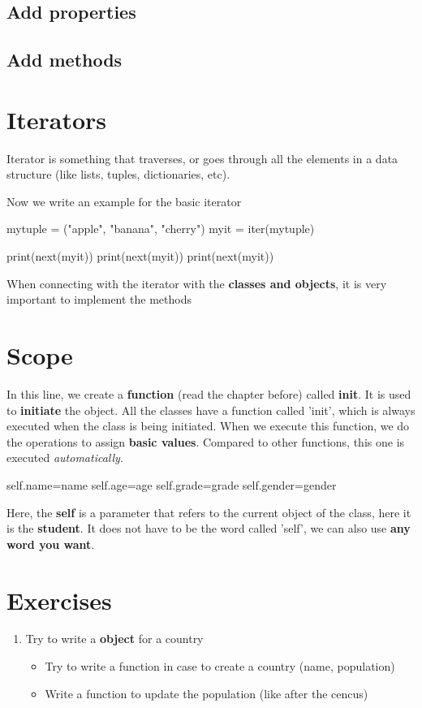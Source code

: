 \documentclass[12pt]{article}
\begin{document}
\subsection{Add properties}
\subsection{Add methods}
\section{Iterators}
Iterator is something that traverses, or goes through all the elements in a data structure (like lists, tuples, dictionaries, etc).

Now we write an example for the basic iterator
\begin{python}
mytuple = ("apple", "banana", "cherry")
myit = iter(mytuple)

print(next(myit))
print(next(myit))
print(next(myit))
\end{python}

When connecting with the iterator with the \textbf{classes and objects}, it is very important to implement the methods 
\section{Scope}

\par In this line, we create a \textbf{function} (read the chapter before) called \textbf{init}. It is used to \textbf{initiate} the object. All the classes have a function called 'init', which is always executed when the class is being initiated. When we execute this function, we do the operations to assign \textbf{basic values}. Compared to other functions, this one is executed \textit{automatically}.
\begin{python}
  self.name=name	
	self.age=age
	self.grade=grade
	self.gender=gender
\end{python}
\par Here, the \textbf{self} is a parameter that refers to the current object of the class, here it is the \textbf{student}. It does not have to be the word called 'self', we can also use \textbf{any word you want}.
\section{Exercises}
\begin{enumerate}
	\item Try to write a \textbf{object} for a country
		\begin{itemize}
			\item Try to write a function in case to create a country (name, population)
			\item Write a function to update the population (like after the cencus)
		\end{itemize}
\end{enumerate}
\newpage
\end{document}
